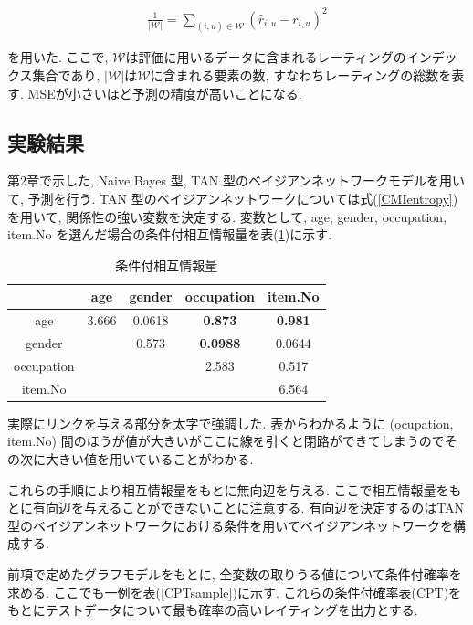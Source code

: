 \documentclass[a4paper]{jarticle}
\begin{document}
\begin{eqnarray}
\label{MSE}
\frac{1}{|\mathcal W|} = \sum_{(i, u) \in \mathcal W} (\hat{r}_{i, u} - r_{i, u})^2
\end{eqnarray}

を用いた. ここで, $\mathcal W$は評価に用いるデータに含まれるレーティングのインデックス集合であり, $|\mathcal W|$は$\mathcal W$に含まれる要素の数, すなわちレーティングの総数を表す. MSEが小さいほど予測の精度が高いことになる.

\subsection{実験結果}

第2章で示した, Naive Bayes 型, TAN 型のベイジアンネットワークモデルを用いて, 予測を行う. TAN 型のベイジアンネットワークについては式(\ref{CMIentropy})を用いて, 関係性の強い変数を決定する. 変数として, age, gender, occupation, item.No を選んだ場合の条件付相互情報量を表(\ref{CMIsample})に示す.

\begin{table}[H]
\begin{center}
\label{CMIsample}
\caption{条件付相互情報量}
\begin{tabular}{|c||c|c|c|c|} \hline  
& age & gender & occupation & item.No \\ \hline \hline
age & 3.666 & 0.0618 & \bf{0.873} & \bf{0.981} \\
gender &  & 0.573 & \bf{0.0988} & 0.0644 \\
occupation &  &  & 2.583 & 0.517 \\
item.No &  &  &  & 6.564 \\ \hline
\end{tabular}
\end{center}
\end{table}

実際にリンクを与える部分を太字で強調した. 表からわかるように (ocupation, item.No) 間のほうが値が大きいがここに線を引くと閉路ができてしまうのでその次に大きい値を用いていることがわかる.

これらの手順により相互情報量をもとに無向辺を与える. ここで相互情報量をもとに有向辺を与えることができないことに注意する. 有向辺を決定するのはTAN 型のベイジアンネットワークにおける条件を用いてベイジアンネットワークを構成する.

前項で定めたグラフモデルをもとに, 全変数の取りうる値について条件付確率を求める. ここでも一例を表(\ref{CPTsample})に示す. これらの条件付確率表(CPT)をもとにテストデータについて最も確率の高いレイティングを出力とする.
\end{document}
